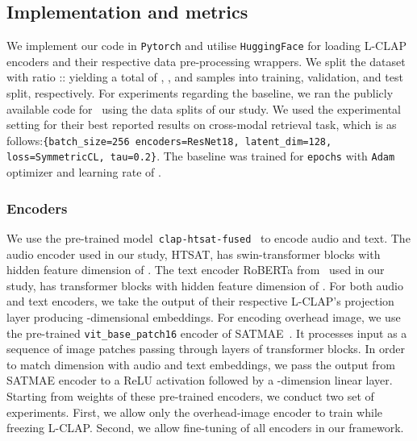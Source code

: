 \documentclass{bmvc2k}
\begin{document}
\subsection{Implementation and metrics}
We implement our code in \texttt{Pytorch} and utilise \texttt{HuggingFace} for loading L-CLAP encoders and their respective data pre-processing wrappers.  We split the dataset with ratio :: yielding a total of , , and  samples into training, validation, and test split, respectively. For experiments regarding the baseline, we ran the publicly available code for~\cite{heidler2023self} using the data splits of our study. We used the experimental setting for their best reported results on cross-modal retrieval task, which is as follows:\texttt{\{batch\_size=256 encoders=ResNet18, latent\_dim=128, loss=SymmetricCL, tau=0.2\}}. The baseline was trained for  \texttt{epochs} with \texttt{Adam} optimizer and learning rate of .


\subsubsection{Encoders}
We use the pre-trained model~\texttt{clap-htsat-fused}~\cite{laionclap2023} to encode audio and text. The audio encoder used in our study, HTSAT, has  swin-transformer blocks with hidden feature dimension of . The text encoder RoBERTa from~\cite{laionclap2023} used in our study, has  transformer blocks with hidden feature dimension of . For both audio and text encoders, we take the output of their respective L-CLAP's projection layer producing -dimensional embeddings.
For encoding overhead image, we use the pre-trained \texttt{vit\_base\_patch16} encoder of SATMAE~\cite{cong2022satmae}. It processes input as a sequence of  image patches passing through  layers of transformer blocks. In order to match dimension with audio and text embeddings, we pass the output from SATMAE encoder to a ReLU activation followed by a -dimension linear layer.
Starting from weights of these pre-trained encoders, we conduct two set of experiments. First, we allow only the overhead-image encoder to train while freezing L-CLAP. Second, we allow fine-tuning of all encoders in our framework. 
\end{document}
